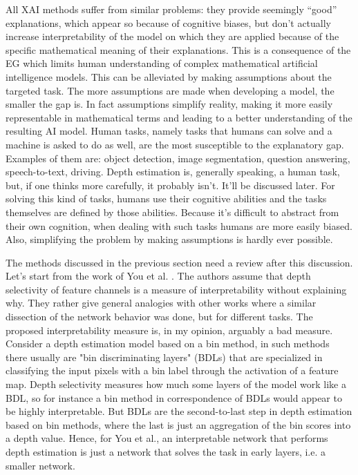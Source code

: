 All XAI methods suffer from similar problems: they provide seemingly “good” explanations, which appear so because of cognitive biases, but don't actually increase interpretability of the model on which they are applied because of the specific mathematical meaning of their explanations.
This is a consequence of the EG which limits human understanding of complex mathematical artificial intelligence models.
This can be alleviated by making assumptions about the targeted task.
The more assumptions are made when developing a model, the smaller the gap is.
In fact assumptions simplify reality, making it more easily representable in mathematical terms and leading to a better understanding of the resulting AI model.
Human tasks, namely tasks that humans can solve and a machine is asked to do as well, are the most susceptible to the explanatory gap.
Examples of them are: object detection, image segmentation, question answering, speech-to-text, driving.
Depth estimation is, generally speaking, a human task, but, if one thinks more carefully, it probably isn't.
It'll be discussed later.
For solving this kind of tasks, humans use their cognitive abilities and the tasks themselves are defined by those abilities.
Because it's difficult to abstract from their own cognition, when dealing with such tasks humans are more easily biased.
Also, simplifying the problem by making assumptions is hardly ever possible.

\vfill

The methods discussed in the previous section need a review after this discussion.
Let's start from the work of You et al. \cite{towards_interpretable}.
The authors assume that depth selectivity of feature channels is a measure of interpretability without explaining why.
They rather give general analogies with other works where a similar dissection of the network behavior was done, but for different tasks.
The proposed interpretability measure is, in my opinion, arguably a bad measure.
Consider a depth estimation model based on a bin method, in such methods there usually are "bin discriminating layers" (BDLs) that are specialized in classifying the input pixels with a bin label through the activation of a feature map.
Depth selectivity measures how much some layers of the model work like a BDL, so for instance a bin method in correspondence of BDLs would appear to be highly interpretable.
But BDLs are the second-to-last step in depth estimation based on bin methods, where the last is just an aggregation of the bin scores into a depth value.
Hence, for You et al., an interpretable network that performs depth estimation is just a network that solves the task in early layers, i.e. a smaller network.

